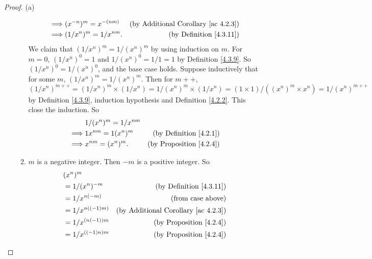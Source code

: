 \begin{proof}{(a)}
\begin{enumerate}[label=(\Roman*)]
\begin{enumerate}[label=(\roman*)]
\begin{align*}
                            \implies & (x^{-n})^m = x^{-(nm)}    & \text{(by Additional Corollary \ref{ac 4.2.3})} \\
                            \implies & (1 / x^n)^m = 1 / x^{nm}. & \text{(by Definition \ref{4.3.11})}
                        \end{align*}
                        We claim that \((1 / x^n)^m = 1 / (x^n)^m\) by using induction on \(m\).
                        For \(m = 0\), \((1 / x^n)^0 = 1\) and \(1 / (x^n)^0 = 1 / 1 = 1\) by Definition \ref{4.3.9}.
                        So \((1 / x^n)^0 = 1 / (x^n)^0\), and the base case holds.
                        Suppose inductively that for some \(m\), \((1 / x^n)^m = 1 / (x^n)^m\).
                        Then for \(m++\), \((1 / x^n)^{m++} = (1 / x^n)^m \times (1 / x^n) = 1 / (x^n)^m \times (1 / x^n) = (1 \times 1) / ((x^n)^m \times x^n) = 1 / (x^n)^{m++}\) by Definition \ref{4.3.9}, induction hypothesis and Definition \ref{4.2.2}.
                        This close the induction.
                        So
                        \begin{align*}
                                     & 1 / (x^n)^m = 1 / x^{nm}                                       \\
                            \implies & 1x^{nm} = 1(x^n)^m       & \text{(by Definition \ref{4.2.1})}  \\
                            \implies & x^{nm} = (x^n)^m.        & \text{(by Proposition \ref{4.2.4})}
                        \end{align*}
                  \item \(m\) is a negative integer.
                        Then \(-m\) is a positive integer.
                        So
                        \begin{align*}
                             & (x^n)^m                                                              \\
                             & = 1 / (x^n)^{-m}   & \text{(by Definition \ref{4.3.11})}             \\
                             & = 1 / x^{n(-m)}    & \text{(from case above)}                        \\
                             & = 1 / x^{n((-1)m)} & \text{(by Additional Corollary \ref{ac 4.2.3})} \\
                             & = 1 / x^{(n(-1))m} & \text{(by Proposition \ref{4.2.4})}             \\
                             & = 1 / x^{((-1)n)m} & \text{(by Proposition \ref{4.2.4})}             \\

\end{align*}
\end{enumerate}
\end{enumerate}
\end{proof}
